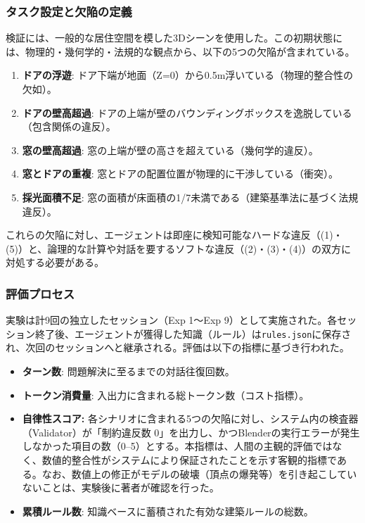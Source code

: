 \documentclass[dvipdfmx, a4paper, 9pt]{deimj}
\begin{document}
\subsubsection{タスク設定と欠陥の定義}

検証には、一般的な居住空間を模した3Dシーンを使用した。この初期状態には、物理的・幾何学的・法規的な観点から、以下の5つの欠陥が含まれている。

\begin{enumerate}
  \item \textbf{ドアの浮遊}: ドア下端が地面（Z=0）から0.5m浮いている（物理的整合性の欠如）。
  \item \textbf{ドアの壁高超過}: ドアの上端が壁のバウンディングボックスを逸脱している（包含関係の違反）。
  \item \textbf{窓の壁高超過}: 窓の上端が壁の高さを超えている（幾何学的違反）。
  \item \textbf{窓とドアの重複}: 窓とドアの配置位置が物理的に干渉している（衝突）。
  \item \textbf{採光面積不足}: 窓の面積が床面積の1/7未満である（建築基準法に基づく法規違反）。
\end{enumerate}

これらの欠陥に対し、エージェントは即座に検知可能なハードな違反（(1)・(5)）と、論理的な計算や対話を要するソフトな違反（(2)・(3)・(4)）の双方に対処する必要がある。

\subsubsection{評価プロセス}

実験は計9回の独立したセッション（Exp 1〜Exp 9）として実施された。各セッション終了後、エージェントが獲得した知識（ルール）は\texttt{rules.json}に保存され、次回のセッションへと継承される。評価は以下の指標に基づき行われた。

\begin{itemize}
    \item \textbf{ターン数}: 問題解決に至るまでの対話往復回数。
    \item \textbf{トークン消費量}: 入出力に含まれる総トークン数（コスト指標）。
    \item \textbf{自律性スコア:} 
    各シナリオに含まれる5つの欠陥に対し、システム内の検査器（Validator）が「制約違反数 0」を出力し、かつBlenderの実行エラーが発生しなかった項目の数（0--5）とする。本指標は、人間の主観的評価ではなく、数値的整合性がシステムにより保証されたことを示す客観的指標である。なお、数値上の修正がモデルの破壊（頂点の爆発等）を引き起こしていないことは、実験後に著者が確認を行った。
    \item \textbf{累積ルール数}: 知識ベースに蓄積された有効な建築ルールの総数。
\end{itemize}
\end{document}
